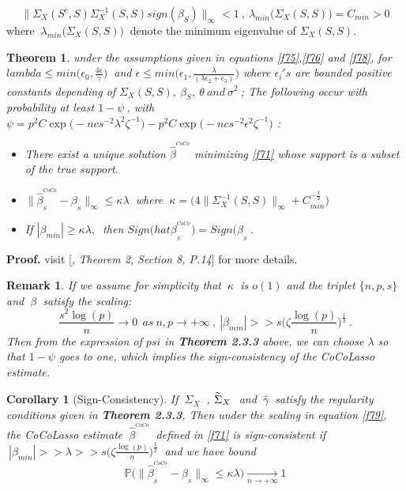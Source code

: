 \documentclass[12pt]{report}
\newtheorem{theoreme}{Theorem}[section] %
\newtheorem{remarque}{Remark}[section]
\newtheorem{corollaire}{Corollary}
\begin{document}
\begin{equation}
	\parallel \Sigma_{X}(S^{c},S)\Sigma_{X}^{-1}(S,S)sign(\beta_{S})\parallel_{\infty}<1\ ,\ \lambda_{min}\big(\Sigma_{X}(S,S)\big)=C_{min}>0
	\label{f78}
\end{equation}
where $\ \lambda_{min}\big(\Sigma_{X}(S,S)\big)\ $ denote the minimum eigenvalue of $\Sigma_{X}(S,S)$.
\begin{theoreme}
	under the assumptions given in equations \eqref{f75},\eqref{f76} and \eqref{f78}, for $lambda\leq min\big(\epsilon_{0},\frac{4\epsilon}{\gamma}\big)\ $ and $\epsilon\leq min\big(\epsilon_{1},\frac{\lambda}{(\lambda \epsilon_{2}+\epsilon_{3})}\big)$ where $\epsilon_{i}'s$ are bounded positive constants depending of $\Sigma_{X}(S,S),\ \beta_{S},\ \theta\ and\ \sigma^{2}\ $; The following occur with probability at least $1-\psi\ $, with\\
	$\psi=p^{2}C\exp\big(-ncs^{-2}\lambda^{2}\zeta^{-1}\big)-p^{2}C\exp\big(-ncs^{-2}\epsilon^{2}\zeta^{-1}\big)$ :
	\begin{itemize}
		\item There exist a unique solution $\hat{\beta}^{^{CoCo}}$ minimizing \eqref{f71} whose support is a subset of the true support.
		\item $\parallel \hat{\beta}^{^{CoCo}}_{_{S}} -\beta_{_{S}}\parallel_{\infty}\leq \kappa\lambda\ $ where $\ \kappa=\big( 4\parallel\Sigma_{X}^{-1}(S,S)\parallel_{\infty}+C_{min}^{-\frac{1}{2}} \big)$
		\item If $|\beta_{min}|\geq \kappa\lambda,\ $ then $Sign\big(hat{\beta}^{^{CoCo}}_{_{S}}\big)=Sign\big(\beta_{_{S}}\ $.
	\end{itemize}
\end{theoreme}
\textbf{Proof.} visit [\cite{nref18}, \textit{Theorem 2, Section 8, P.14}] for more details.
\begin{remarque}
	If we assume for simplicity that $\ \kappa\ $ is $o(1)$ and the triplet $\{n,p,s\}$ and $\ \beta\ $ satisfy the scaling:
	\begin{equation}
		\frac{s^{2}\log(p)}{n}\longrightarrow 0\ \ as\ n,p\rightarrow+\infty\ ,\ |\beta_{min}|>>s\bigg(\zeta \frac{\log(p)}{n}\bigg)^{\frac{1}{2}}\ .
		\label{f79}
	\end{equation}
	Then from the expression of $psi$ in \textbf{Theorem 2.3.3} above, we can choose $\lambda$ so that $1-\psi$ goes to one, which implies the sign-consistency of the CoCoLasso estimate.
\end{remarque}
\begin{corollaire}[Sign-Consistency]
	If $\ \Sigma_{X}\ $ , $\overset{_{\thicksim}}{\Sigma}_{X}\ $ and $\ \hat{\gamma}\ $ satisfy the regularity conditions given in \textbf{Theorem 2.3.3}, Then under the scaling in equation \eqref{f79}, the CoCoLasso estimate $\ \hat{\beta}^{^{CoCo}}\ $ defined in \eqref{f71} is sign-consistent if $\ |\beta_{min}|>>\lambda>>s\big(\zeta \frac{\log(p)}{n}\big)^{\frac{1}{2}}\ $ and we have bound 
	\begin{equation}
		\mathbb{P}\bigg(\parallel \hat{\beta}^{^{CoCo}}_{_{S}} -\beta_{_{S}}\parallel_{\infty}\leq \kappa\lambda\bigg) \underset{n\rightarrow+\infty}{\longrightarrow}1
	\end{equation}

\end{corollaire}
\end{document}
